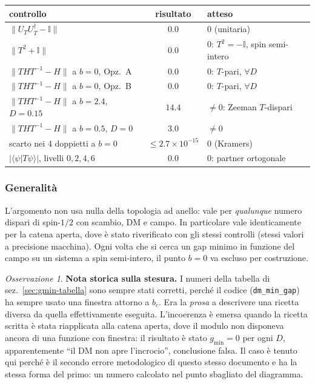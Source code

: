 \documentclass[11pt,a4paper]{article}
\theoremstyle{remark}
\newtheorem*{osservazionekramers}{Osservazione}
\begin{document}
\begin{center}
\renewcommand{\arraystretch}{1.3}
\small
\begin{tabular}{@{}lcl@{}}
\toprule
controllo & risultato & atteso \\
\midrule
$\|U_T U_T^\dagger-\mathbb{I}\|$ & $0.0$ & $0$ (unitaria) \\
$\|T^2+\mathbb{I}\|$ & $0.0$ & $0$: $T^2=-\mathbb{I}$, spin semi-intero \\
$\|THT^{-1}-H\|$ a $b=0$, Opz.\ A & $0.0$ & $0$: $T$-pari, $\forall D$ \\
$\|THT^{-1}-H\|$ a $b=0$, Opz.\ B & $0.0$ & $0$: $T$-pari, $\forall D$ \\
$\|THT^{-1}-H\|$ a $b=2.4$, $D=0.15$ & $14.4$ & $\neq0$: Zeeman $T$-dispari \\
$\|THT^{-1}-H\|$ a $b=0.5$, $D=0$ & $3.0$ & $\neq0$ \\
scarto nei 4 doppietti a $b=0$ & $\leq2.7{\times}10^{-15}$ & $0$ (Kramers) \\
$|\langle\psi|T\psi\rangle|$, livelli $0,2,4,6$ & $0.0$ & $0$: partner ortogonale \\
\bottomrule
\end{tabular}
\end{center}

\subsubsection*{Generalità}

L'argomento non usa nulla della topologia ad anello: vale per \emph{qualunque}
numero dispari di spin-$1/2$ con scambio, DM e campo. In particolare vale
identicamente per la catena aperta, dove è stato riverificato con gli stessi
controlli (stessi valori a precisione macchina). Ogni volta che si cerca un gap
minimo in funzione del campo su un sistema a spin semi-intero, il punto $b=0$ va
escluso per costruzione.

\begin{osservazionekramers}
\textbf{Nota storica sulla stesura.} I numeri della tabella di
sez.~\ref{sec:gmin-tabella} sono sempre stati corretti, perché il codice
(\texttt{dm\_min\_gap}) ha sempre usato una finestra attorno a $b_c$. Era la
\emph{prosa} a descrivere una ricetta diversa da quella effettivamente eseguita.
L'incoerenza è emersa quando la ricetta scritta è stata riapplicata alla catena
aperta, dove il modulo non disponeva ancora di una funzione con finestra: il
risultato è stato $g_\text{min}=0$ per ogni $D$, apparentemente ``il DM non apre
l'incrocio'', conclusione falsa. Il caso è tenuto qui perché è il secondo errore
metodologico di questo stesso documento e ha la stessa forma del primo: un
numero calcolato nel punto sbagliato del diagramma.
\end{osservazionekramers}
\end{document}
